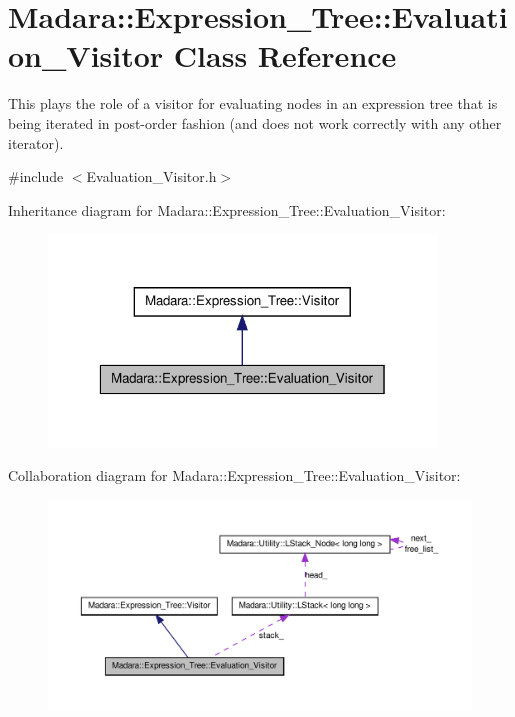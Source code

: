 \hypertarget{classMadara_1_1Expression__Tree_1_1Evaluation__Visitor}{
\section{Madara::Expression\_\-Tree::Evaluation\_\-Visitor Class Reference}
\label{d5/db2/classMadara_1_1Expression__Tree_1_1Evaluation__Visitor}
}


This plays the role of a visitor for evaluating nodes in an expression tree that is being iterated in post-\/order fashion (and does not work correctly with any other iterator).  




{\ttfamily \#include $<$Evaluation\_\-Visitor.h$>$}



Inheritance diagram for Madara::Expression\_\-Tree::Evaluation\_\-Visitor:
\nopagebreak
\begin{figure}[H]
\begin{center}
\leavevmode
\includegraphics[width=292pt]{db/dda/classMadara_1_1Expression__Tree_1_1Evaluation__Visitor__inherit__graph}
\end{center}
\end{figure}


Collaboration diagram for Madara::Expression\_\-Tree::Evaluation\_\-Visitor:
\nopagebreak
\begin{figure}[H]
\begin{center}
\leavevmode
\includegraphics[width=400pt]{dd/d5c/classMadara_1_1Expression__Tree_1_1Evaluation__Visitor__coll__graph}
\end{center}
\end{figure}
